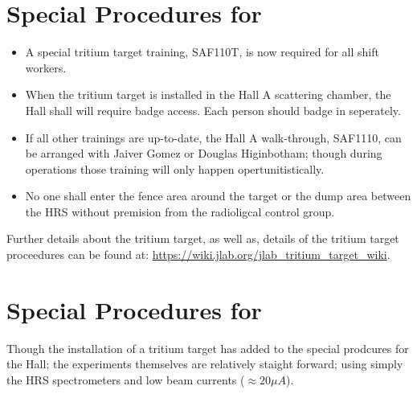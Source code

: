 
%
%
\newpage
\section{Special Procedures for \HALL}

\begin{itemize}

\item{
A special tritium target training, SAF110T, is now required for all shift workers.
}

\item{
When the tritium target is installed in the Hall A scattering chamber, the Hall shall
will require badge access.   Each person should badge in seperately.
}

\item{
If all other trainings are up-to-date, the Hall A walk-through, SAF1110, can be arranged 
with Jaiver Gomez or Douglas Higinbotham; though during operations those training will only 
happen opertunitistically.   
}

\item{
No one shall enter the fence area around the target or the dump area between the HRS without
premision from the radioligcal control group.  
}

\end{itemize}

Further details about the tritium target, as well as, details of the tritium target proceedures
can be found at: \url{https://wiki.jlab.org/jlab_tritium_target_wiki}.
 


%
%
\section{Special Procedures for \EXPTS}

Though the installation of a tritium target has added to the special prodcures for
the Hall; the experiments themselves are relatively staight forward; using  
simply the HRS spectrometers and low beam currents ($\approx 20 \mu A$). 

